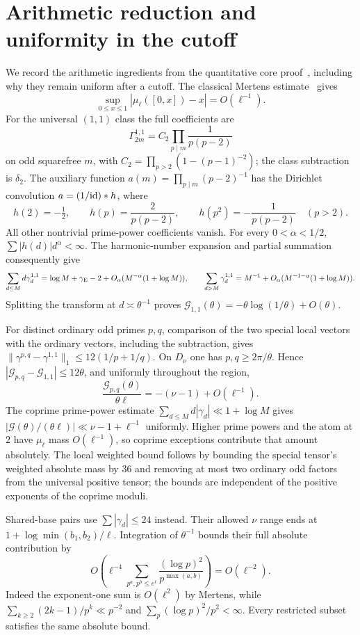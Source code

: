 \documentclass[11pt]{article}
\newcommand{\G}{\mathcal G}
\begin{document}
\section{Arithmetic reduction and uniformity in the cutoff}
We record the arithmetic ingredients from the quantitative core
proof~\cite{core}, including why they remain uniform after a cutoff.
The classical Mertens estimate~\cite{mertens} gives
\begin{equation}\label{eq:mertens}
 \sup_{0\leq x\leq1}|\mu_\ell([0,x])-x|=O(\ell^{-1}).
\end{equation}
For the universal $(1,1)$ class the full coefficients are
\[
 \Gamma_{2m}^{1,1}=C_2\prod_{p\mid m}\frac1{p(p-2)}
\]
on odd squarefree $m$, with $C_2=\prod_{p>2}(1-(p-1)^{-2})$;
the class subtraction is $\delta_2$.
The auxiliary function $a(m)=\prod_{p\mid m}(p-2)^{-1}$ has the
Dirichlet convolution $a=(1/{\rm id})*h$, where
\[
 h(2)=-\tfrac12,\qquad h(p)=\frac2{p(p-2)},\qquad
 h(p^2)=-\frac1{p(p-2)}\quad(p>2).
\]
All other nontrivial prime-power coefficients vanish.
For every $0<\alpha<1/2$, $\sum|h(d)|d^\alpha<\infty$.
The harmonic-number expansion and partial summation consequently give
\[
 \sum_{d\leq M}d\gamma_d^{1,1}
 =\log M+\gamma_{\rm E}-2
   +O_\alpha(M^{-\alpha}(1+\log M)),\qquad
 \sum_{d>M}\gamma_d^{1,1}
 =M^{-1}+O_\alpha(M^{-1-\alpha}(1+\log M)).
\]
Splitting the transform at $d\asymp\theta^{-1}$ proves
$\G_{1,1}(\theta)=-\theta\log(1/\theta)+O(\theta)$.

For distinct ordinary odd primes $p,q$, comparison of the two
special local vectors with the ordinary vectors, including the
subtraction, gives
$\|\gamma^{p,q}-\gamma^{1,1}\|_1\leq12(1/p+1/q)$.
On $D_\nu$ one has $p,q\geq2\pi/\theta$. Hence
$|\G_{p,q}-\G_{1,1}|\leq12\theta$, and uniformly throughout the region,
\begin{equation}\label{eq:ordinary}
 \frac{\G_{p,q}(\theta)}{\theta\ell}
 =-(\nu-1)+O(\ell^{-1}).
\end{equation}
The coprime prime-power estimate
$\sum_{d\leq M}d|\gamma_d|\ll1+\log M$ gives
$|\G(\theta)/(\theta\ell)|\ll\nu-1+\ell^{-1}$ uniformly.
Higher prime powers and the atom at $2$ have $\mu_\ell$ mass
$O(\ell^{-1})$, so coprime exceptions contribute that amount absolutely.
The local weighted bound follows by bounding the special tensor's
weighted absolute mass by $36$ and removing at most two ordinary odd
factors from the universal positive tensor; the bounds are independent
of the positive exponents of the coprime moduli.

Shared-base pairs use $\sum|\gamma_d|\leq24$ instead. Their allowed
$\nu$ range ends at $1+\log\min(b_1,b_2)/\ell$. Integration of
$\theta^{-1}$ bounds their full absolute contribution by
\[
 O\left(\ell^{-4}
 \sum_{p^a,p^b\leq e^\ell}\frac{(\log p)^2}{p^{\max(a,b)}}\right)
 =O(\ell^{-2}).
\]
Indeed the exponent-one sum is $O(\ell^2)$ by Mertens, while
$\sum_{k\geq2}(2k-1)/p^k\ll p^{-2}$ and
$\sum_p(\log p)^2/p^2<\infty$. Every restricted subset satisfies
the same absolute bound.
\end{document}
